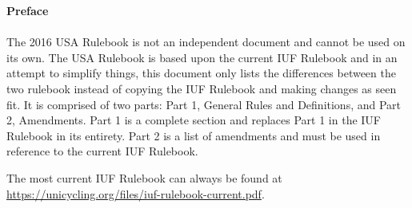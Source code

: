 {\huge \bf{Preface} \\}
\thispagestyle{plain}
\setcounter{page}{3}
\\
The 2016 USA Rulebook is not an independent document and cannot be used on its own.
The USA Rulebook is based upon the current IUF Rulebook and in an attempt to simplify things, this document only lists the differences between the two rulebook instead of copying the IUF Rulebook and making changes as seen fit.
It is comprised of two parts: Part 1, General Rules and Definitions, and Part 2, Amendments.
Part 1 is a complete section and replaces Part 1 in the IUF Rulebook in its entirety.
Part 2 is a list of amendments and must be used in reference to the current IUF Rulebook.

The most current IUF Rulebook can always be found at \url{https://unicycling.org/files/iuf-rulebook-current.pdf}.
